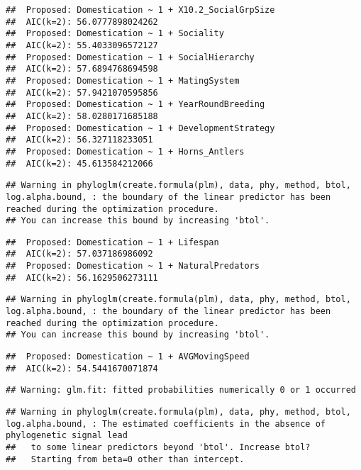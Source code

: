\documentclass[
]{article}
\begin{document}
\begin{verbatim}
##  Proposed: Domestication ~ 1 + X10.2_SocialGrpSize
##  AIC(k=2): 56.0777898024262
##  Proposed: Domestication ~ 1 + Sociality
##  AIC(k=2): 55.4033096572127
##  Proposed: Domestication ~ 1 + SocialHierarchy
##  AIC(k=2): 57.6894768694598
##  Proposed: Domestication ~ 1 + MatingSystem
##  AIC(k=2): 57.9421070595856
##  Proposed: Domestication ~ 1 + YearRoundBreeding
##  AIC(k=2): 58.0280171685188
##  Proposed: Domestication ~ 1 + DevelopmentStrategy
##  AIC(k=2): 56.327118233051
##  Proposed: Domestication ~ 1 + Horns_Antlers
##  AIC(k=2): 45.613584212066
\end{verbatim}

\begin{verbatim}
## Warning in phyloglm(create.formula(plm), data, phy, method, btol, log.alpha.bound, : the boundary of the linear predictor has been reached during the optimization procedure.
## You can increase this bound by increasing 'btol'.
\end{verbatim}

\begin{verbatim}
##  Proposed: Domestication ~ 1 + Lifespan
##  AIC(k=2): 57.037186986092
##  Proposed: Domestication ~ 1 + NaturalPredators
##  AIC(k=2): 56.1629506273111
\end{verbatim}

\begin{verbatim}
## Warning in phyloglm(create.formula(plm), data, phy, method, btol, log.alpha.bound, : the boundary of the linear predictor has been reached during the optimization procedure.
## You can increase this bound by increasing 'btol'.
\end{verbatim}

\begin{verbatim}
##  Proposed: Domestication ~ 1 + AVGMovingSpeed
##  AIC(k=2): 54.5441670071874
\end{verbatim}

\begin{verbatim}
## Warning: glm.fit: fitted probabilities numerically 0 or 1 occurred
\end{verbatim}

\begin{verbatim}
## Warning in phyloglm(create.formula(plm), data, phy, method, btol, log.alpha.bound, : The estimated coefficients in the absence of phylogenetic signal lead
##   to some linear predictors beyond 'btol'. Increase btol?
##   Starting from beta=0 other than intercept.
\end{verbatim}
\end{document}

